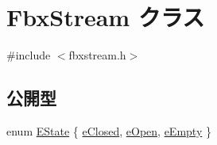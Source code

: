 \hypertarget{class_fbx_stream}{}\section{Fbx\+Stream クラス}
\label{class_fbx_stream}


{\ttfamily \#include $<$fbxstream.\+h$>$}

\subsection*{公開型}
\begin{DoxyCompactItemize}
\item 
enum \hyperlink{class_fbx_stream_adc469d38eb30339fa4190eb6c66ec8f7}{E\+State} \{ \hyperlink{class_fbx_stream_adc469d38eb30339fa4190eb6c66ec8f7a960b577245aea4e5fb73b4c8430f3830}{e\+Closed}, 
\hyperlink{class_fbx_stream_adc469d38eb30339fa4190eb6c66ec8f7a87c8f9d5a45dc6123fadc18e5a6e3195}{e\+Open}, 
\hyperlink{class_fbx_stream_adc469d38eb30339fa4190eb6c66ec8f7a3187889296102999260bf0cff24078ac}{e\+Empty}
 \}
\end{DoxyCompactItemize}
